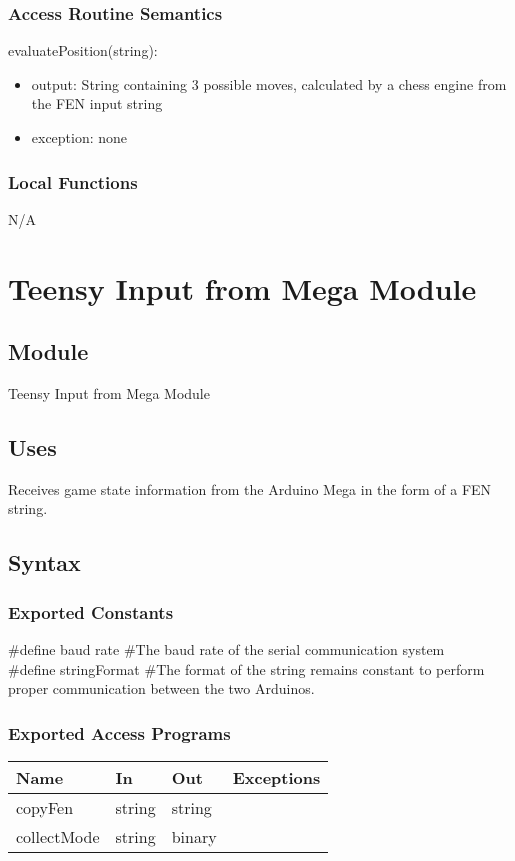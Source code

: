 \documentclass[12pt, titlepage]{article}
\begin{document}
    \subsubsection{Access Routine Semantics}
        \noindent evaluatePosition(string):
        \begin{itemize}
            \item output: String containing 3 possible moves, calculated by a chess engine from the FEN input string
            \item exception: none
        \end{itemize}

    \subsubsection{Local Functions}
    N/A

\newpage

\section{Teensy Input from Mega Module} \label{TeensyToMegaRx}
    \subsection{Module}
    Teensy Input from Mega Module

    \subsection{Uses}
    Receives game state information from the Arduino Mega in the form of a FEN string. 

    \subsection{Syntax}
    \subsubsection{Exported Constants}
    \#define baud rate \#The baud rate of the serial communication system\\
    \#define stringFormat \#The format of the string remains constant to perform proper 
    communication between the two Arduinos.
    
    \subsubsection{Exported Access Programs}
        \begin{center}
        \begin{tabular}{p{4cm} p{3cm} p{3cm} p{2.5cm}}
        \hline
        \textbf{Name} & \textbf{In} & \textbf{Out} & \textbf{Exceptions} \\
        \hline
        copyFen & string & string & \\
        collectMode & string & binary & \\
        \hline
        \end{tabular}
        \end{center}
\end{document}
